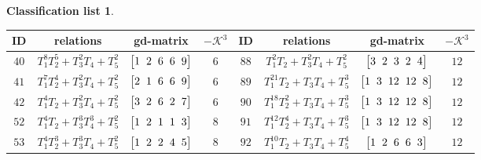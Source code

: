 \documentclass[10pt,a4paper]{amsart}
\theoremstyle{definition}
\newtheorem{class-list}[thm]{Classification list}
\numberwithin{equation}{section}
\begin{document}
\begin{class-list}
\begin{table}[t!]\centering\setlength{\tabcolsep}{3.5pt}
\renewcommand{\arraystretch}{1.25}\small\tabulinesep=1mm
\begin{tabu}{c|c|c|c||c|c|c|c}
\hline
ID&relations&gd-matrix&$-\mathcal{K}^3$&ID&relations&gd-matrix&$-\mathcal{K}^3$
\\
\hline
${40}$&${T_{1}^{8}T_{2}^{5}+T_{3}^{2}T_{4}+T_{5}^{2}}$
&$\arraycolsep=1mm\begin{bmatrix}{1} & {2} & {6} & {6} & {9}\end{bmatrix}$&${6}$
&${88}$&${T_{1}^{2}T_{2}+T_{3}^{2}T_{4}+T_{5}^{2}}$
&$\arraycolsep=1mm\begin{bmatrix}{3} & {2} & {3} & {2} & {4}\end{bmatrix}$&${12}$
\\
\hline
${41}$&${T_{1}^{7}T_{2}^{4}+T_{3}^{2}T_{4}+T_{5}^{2}}$
&$\arraycolsep=1mm\begin{bmatrix}{2} & {1} & {6} & {6} & {9}\end{bmatrix}$&${6}$
&${89}$&${T_{1}^{21}T_{2}+T_{3}T_{4}+T_{5}^{3}}$
&$\arraycolsep=1mm\begin{bmatrix}{1} & {3} & {12} & {12} & {8}\end{bmatrix}$&${12}$
\\
\hline
${42}$&${T_{1}^{4}T_{2}+T_{3}^{2}T_{4}+T_{5}^{2}}$
&$\arraycolsep=1mm\begin{bmatrix}{3} & {2} & {6} & {2} & {7}\end{bmatrix}$&${6}$
&${90}$&${T_{1}^{18}T_{2}^{2}+T_{3}T_{4}+T_{5}^{3}}$
&$\arraycolsep=1mm\begin{bmatrix}{1} & {3} & {12} & {12} & {8}\end{bmatrix}$&${12}$
\\
\hline
${52}$&${T_{1}^{4}T_{2}+T_{3}^{3}T_{4}^{3}+T_{5}^{2}}$
&$\arraycolsep=1mm\begin{bmatrix}{1} & {2} & {1} & {1} & {3}\end{bmatrix}$&${8}$
&${91}$&${T_{1}^{12}T_{2}^{4}+T_{3}T_{4}+T_{5}^{3}}$
&$\arraycolsep=1mm\begin{bmatrix}{1} & {3} & {12} & {12} & {8}\end{bmatrix}$&${12}$
\\
\hline
${53}$&${T_{1}^{4}T_{2}^{3}+T_{3}^{3}T_{4}+T_{5}^{2}}$
&$\arraycolsep=1mm\begin{bmatrix}{1} & {2} & {2} & {4} & {5}\end{bmatrix}$&${8}$
&${92}$&${T_{1}^{10}T_{2}+T_{3}T_{4}+T_{5}^{4}}$
&$\arraycolsep=1mm\begin{bmatrix}{1} & {2} & {6} & {6} & {3}\end{bmatrix}$&${12}$

\end{tabu}
\end{table}
\end{class-list}
\end{document}

